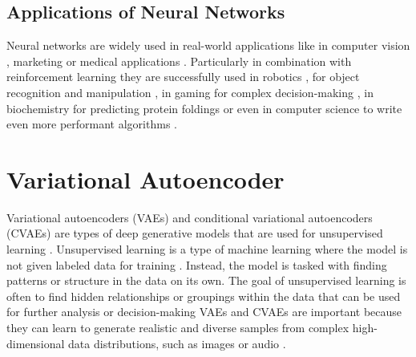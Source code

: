 \subsection{Applications of Neural Networks}


Neural networks are widely used in real-world applications like in computer vision \cite{VGG16} \cite{ResNet50}, marketing \cite{DL_Targeting} or medical applications \cite{DL_medical}. Particularly in combination with reinforcement learning they are successfully used in robotics \cite{RL_robotics}, for object recognition \cite{DL_object_recognition} and manipulation \cite{RL_object_manipulation}, in gaming for complex decision-making \cite{SAC_VideoGames_Paper}, in biochemistry for predicting protein foldings \cite{AlphaFold} or even in computer science to write even more performant algorithms \cite{AlphaCode}.

% 

\section{Variational Autoencoder}

Variational autoencoders (VAEs) and conditional variational autoencoders (CVAEs) are types of deep generative models that are used for unsupervised learning \cite{pml2Book}. Unsupervised learning is a type of machine learning where the model is not given labeled data for training \cite{pml1Book}. Instead, the model is tasked with finding patterns or structure in the data on its own. The goal of unsupervised learning is often to find hidden relationships or groupings within the data that can be used for further analysis or decision-making
VAEs and CVAEs are important because they can learn to generate realistic and diverse samples from complex high-dimensional data distributions, such as images or audio \cite{VAE}.

